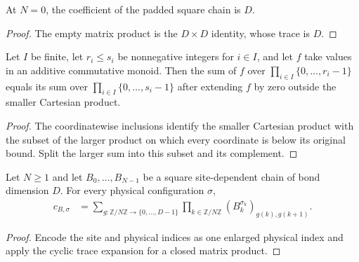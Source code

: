\begin{lemma}
    \label{thm:varying_bond_obc_zero_pad_zero}
    \leanok
    At $N=0$, the coefficient of the padded square chain is $D$.
\end{lemma}

\begin{proof}
    \leanok
    The empty matrix product is the $D\times D$ identity, whose trace is $D$.
\end{proof}

\begin{lemma}
    \label{thm:pi_fin_sum_zero_extension}
    \leanok
    Let $I$ be finite, let $r_i\leq s_i$ be nonnegative integers for
    $i\in I$, and let $f$ take values in an additive commutative monoid. Then
    the sum of $f$ over $\prod_{i\in I}\{0,\ldots,r_i-1\}$ equals its sum over
    $\prod_{i\in I}\{0,\ldots,s_i-1\}$ after extending $f$ by zero outside
    the smaller Cartesian product.
\end{lemma}

\begin{proof}
    \leanok
    The coordinatewise inclusions identify the smaller Cartesian product with
    the subset of the larger product on which every coordinate is below its
    original bound. Split the larger sum into this subset and its complement.
\end{proof}

\begin{lemma}
    \label{thm:chain_coeff_sum_cyclic}
    \leanok
    Let $N\geq1$ and let $B_0,\ldots,B_{N-1}$ be a square site-dependent
    chain of bond dimension $D$. For every physical configuration $\sigma$,
    \begin{align}
        c_{B,\sigma}
         & =\sum_{g\colon\mathbb Z/N\mathbb Z\to\{0,\ldots,D-1\}}
        \prod_{k\in\mathbb Z/N\mathbb Z}
        (B_k^{\sigma_k})_{g(k),g(k+1)}.
        \label{eq:chain_coeff_sum_cyclic}
    \end{align}
\end{lemma}

\begin{proof}
    \leanok
    Encode the site and physical indices as one enlarged physical index and
    apply the cyclic trace expansion for a closed matrix product.
\end{proof}

